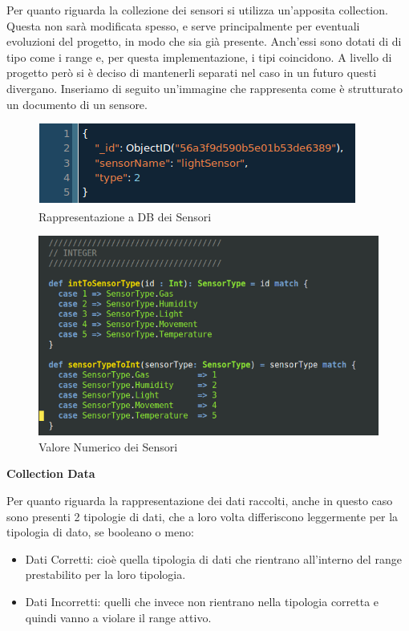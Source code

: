 Per quanto riguarda la collezione dei sensori si utilizza un'apposita collection. Questa non sar\`a modificata spesso, e serve principalmente per eventuali evoluzioni del progetto, in modo che sia gi\`a presente. Anch'essi sono dotati di di tipo come i range e, per questa implementazione, i tipi coincidono. A livello di progetto per\`o si \`e deciso di mantenerli separati nel caso in un futuro questi divergano. Inseriamo di seguito un'immagine che rappresenta come \`e strutturato un documento di un sensore.

\begin{figure}[ht]
\centering
\includegraphics[scale=0.5,natwidth=610,natheight=642]{Figures/DataStructures/SensorsValues.png}
\caption{Rappresentazione a DB dei Sensori}
\end{figure}


\begin{figure}[ht]
\centering
\includegraphics[scale=0.5,natwidth=610,natheight=642]{Figures/DataStructures/Sensors.png}
\caption{Valore Numerico dei Sensori}
\end{figure}

\afterpage{\clearpage}

\newpage

\begin{center}
\textbf{Collection Data}
\end{center}

Per quanto riguarda la rappresentazione dei dati raccolti, anche in questo caso sono presenti 2 tipologie di dati, che a loro volta differiscono leggermente per la tipologia di dato, se booleano o meno:
\begin{itemize}
\item Dati Corretti: cio\`e quella tipologia di dati che rientrano all'interno del range prestabilito per la loro tipologia.
\item Dati Incorretti: quelli che invece non rientrano nella tipologia corretta e quindi vanno a violare il range attivo.
\end{itemize}

